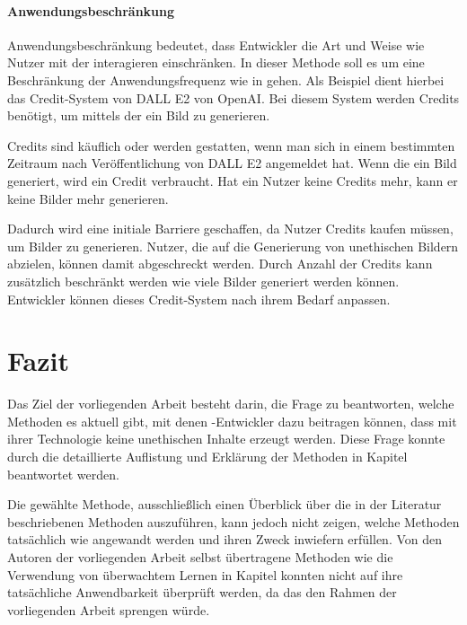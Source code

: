 \documentclass[hidelinks,12pt]{report}
\begin{document}
\subsubsection{Anwendungsbeschränkung} %
Anwendungsbeschränkung bedeutet, dass Entwickler die Art und Weise wie Nutzer mit der  interagieren einschränken. In dieser Methode soll es um eine Beschränkung der Anwendungsfrequenz wie in \cite{Jang} gehen. Als Beispiel dient hierbei das Credit-System von DALL E2 von OpenAI. Bei diesem System werden Credits benötigt, um mittels der  ein Bild zu generieren. 

Credits sind käuflich oder werden gestatten, wenn man sich in einem bestimmten Zeitraum nach Veröffentlichung von DALL E2 angemeldet hat. Wenn die  ein Bild generiert, wird ein Credit verbraucht. Hat ein Nutzer keine Credits mehr, kann er keine Bilder mehr generieren. 

Dadurch wird eine initiale Barriere geschaffen, da Nutzer Credits kaufen müssen, um Bilder zu generieren. Nutzer, die auf die Generierung von unethischen Bildern abzielen, können damit abgeschreckt werden. Durch Anzahl der Credits kann zusätzlich beschränkt werden wie viele Bilder generiert werden können. Entwickler können dieses Credit-System nach ihrem Bedarf anpassen.

\newpage
\begingroup
\let\clearpage\relax

\chapter{Fazit}
Das Ziel der vorliegenden Arbeit besteht darin, die Frage zu beantworten, welche Methoden es aktuell gibt, mit denen -Entwickler dazu beitragen können, dass mit ihrer Technologie keine unethischen Inhalte erzeugt werden. Diese Frage konnte durch die detaillierte Auflistung und Erklärung der Methoden in Kapitel  beantwortet werden. 

Die gewählte Methode, ausschließlich einen Überblick über die in der Literatur beschriebenen Methoden auszuführen, kann jedoch nicht zeigen, welche Methoden tatsächlich wie angewandt werden und ihren Zweck inwiefern erfüllen. Von den Autoren der vorliegenden Arbeit selbst übertragene Methoden wie die Verwendung von überwachtem Lernen in Kapitel  konnten nicht auf ihre tatsächliche Anwendbarkeit überprüft werden, da das den Rahmen der vorliegenden Arbeit sprengen würde. \\
\end{document}
